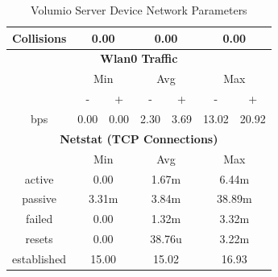 \documentclass[11pt,a4paper]{scrreprt}
\begin{document}
\begin{table}[H]
\begin{tabular}{||c|c|c|c|c|c|c||}
    \hline
    Collisions & \multicolumn{2}{|c|}{0.00} & \multicolumn{2}{|c|}{0.00} & \multicolumn{2}{|c|}{0.00} \\
    \hline\hline
    \multicolumn{7}{|c|}{\textbf{Wlan0 Traffic}} \\
    \hline\hline
      & \multicolumn{2}{|c|}{Min} & \multicolumn{2}{|c|}{Avg} & \multicolumn{2}{|c|}{Max} \\
    \hline
      & - & + & - & + & - & + \\
    \hline
    bps  & 0.00 & 0.00 & 2.30 & 3.69 & 13.02 & 20.92 \\
    \hline\hline
    \multicolumn{7}{|c|}{\textbf{Netstat (TCP Connections)}} \\
    \hline\hline
      & \multicolumn{2}{|c|}{Min} & \multicolumn{2}{|c|}{Avg} & \multicolumn{2}{|c|}{Max} \\
    \hline
    active & \multicolumn{2}{|c|}{0.00} & \multicolumn{2}{|c|}{1.67m} & \multicolumn{2}{|c|}{6.44m} \\
    \hline
    passive & \multicolumn{2}{|c|}{3.31m} & \multicolumn{2}{|c|}{3.84m} & \multicolumn{2}{|c|}{38.89m} \\
    \hline
    failed & \multicolumn{2}{|c|}{0.00} & \multicolumn{2}{|c|}{1.32m} & \multicolumn{2}{|c|}{3.32m} \\
    \hline
    resets & \multicolumn{2}{|c|}{0.00} & \multicolumn{2}{|c|}{38.76u} & \multicolumn{2}{|c|}{3.22m} \\
    \hline
    established & \multicolumn{2}{|c|}{15.00} & \multicolumn{2}{|c|}{15.02} & \multicolumn{2}{|c|}{16.93} \\
    \hline\hline
    \end{tabular}
    \caption{Volumio Server Device Network Parameters}
    \label{VolumioserverNetTab}
\end{table}
\end{document}

